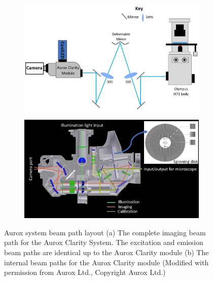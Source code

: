 \begin{figure}[h]
	\begin{subfigure}{0.48\textwidth}
		\centering
		\includegraphics[width=\linewidth]{images/Aurox_beam_path.jpg}
		\caption{}
		\label{fig:aurox_beam_path}
	\end{subfigure}
	\begin{subfigure}{0.48\textwidth}
		\centering
		\includegraphics[width=\linewidth]{images/aurox_clarity_internal.png}
		\caption{}
		\label{fig:aurox_clarity_internal}
	\end{subfigure}
	\caption{Aurox system beam path layout (a) The complete imaging beam path for the Aurox Clarity System. The excitation and emission beam paths are identical up to the Aurox Clarity module (b) The internal beam paths for the Aurox Clarity module (Modified with permission from Aurox Ltd., Copyright Aurox Ltd.)}
	\label{fig:aurox_system}
\end{figure}


